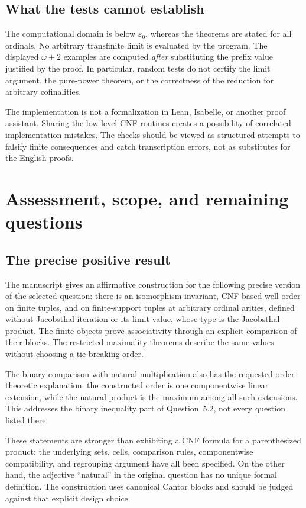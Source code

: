\documentclass[11pt,letterpaper]{article}
\theoremstyle{definition}
\theoremstyle{remark}
\newcommand{\ep}{\varepsilon_0}
\begin{document}
\subsection{What the tests cannot establish}

The computational domain is below $\ep$, whereas the theorems are stated
for all ordinals. No arbitrary transfinite limit is evaluated by the
program. The displayed $\omega+2$ examples are computed \emph{after}
substituting the prefix value justified by the proof. In particular,
random tests do not certify the limit argument, the pure-power theorem,
or the correctness of the reduction for arbitrary cofinalities.

The implementation is not a formalization in Lean, Isabelle, or another
proof assistant. Sharing the low-level CNF routines creates a possibility
of correlated implementation mistakes. The checks should be viewed as
structured attempts to falsify finite consequences and catch transcription
errors, not as substitutes for the English proofs.

\section{Assessment, scope, and remaining questions}\label{sec:scope}

\subsection{The precise positive result}

The manuscript gives an affirmative construction for the following
precise version of the selected question: there is an isomorphism-invariant,
CNF-based well-order on finite tuples, and on finite-support tuples at
arbitrary ordinal arities, defined without Jacobsthal iteration or its
limit value, whose type is the Jacobsthal product. The finite objects
prove associativity through an explicit comparison of their blocks.
The restricted maximality theorems describe the same values without
choosing a tie-breaking order.

The binary comparison with natural multiplication also has the requested
order-theoretic explanation: the constructed order is one componentwise
linear extension, while the natural product is the maximum among all
such extensions. This addresses the binary inequality part of
Question~5.2, not every question listed there.

These statements are stronger than exhibiting a CNF formula for a
parenthesized product: the underlying sets, cells, comparison rules,
componentwise compatibility, and regrouping argument have all been
specified. On the other hand, the adjective ``natural'' in the original
question has no unique formal definition. The construction uses canonical
Cantor blocks and should be judged against that explicit design choice.
\end{document}
